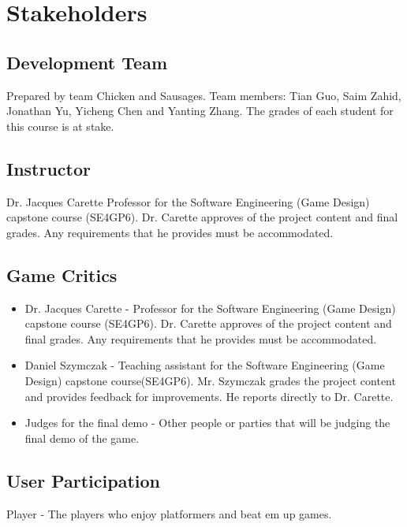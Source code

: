 \documentclass{article}
\begin{document}
	\section{Stakeholders}
	\subsection{Development Team} Prepared by team Chicken and Sausages. Team members: Tian Guo, Saim Zahid, Jonathan Yu, Yicheng Chen and Yanting Zhang. The grades of each student for this course is at stake.
	\subsection{Instructor} Dr. Jacques Carette
	Professor for the Software Engineering (Game Design) capstone course (SE4GP6).  Dr. Carette approves of the project content and final grades. Any requirements that he provides must be accommodated. 
	\subsection{Game Critics}
	\begin{itemize}
		\item Dr. Jacques Carette -
		Professor for the Software Engineering (Game Design) capstone course (SE4GP6).  Dr. Carette approves of the project content and final grades. Any requirements that he provides must be accommodated.
		\item Daniel Szymczak -
		Teaching assistant for the Software Engineering (Game Design) capstone course(SE4GP6). Mr. Szymczak grades the project content and provides feedback for improvements. He reports directly to Dr. Carette.
		\item Judges for the final demo - Other people or parties that will be judging the final demo of the game.
		

	\end{itemize}
	\subsection{User Participation}
	    Player - The players who enjoy platformers and beat em up games.
\end{document}
